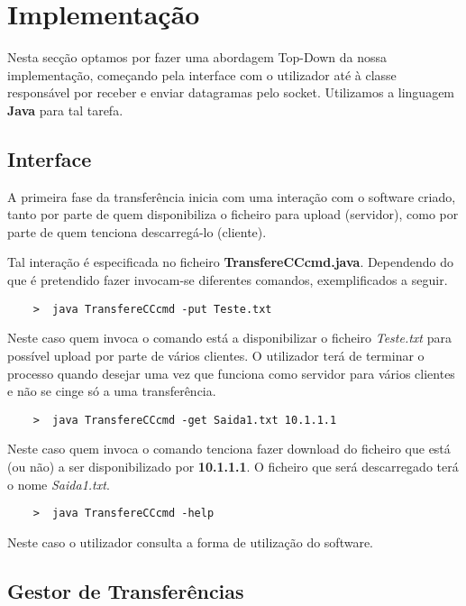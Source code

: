 \documentclass{llncs}
\begin{document}
\section{Implementação}

Nesta secção optamos por fazer uma abordagem Top-Down da nossa implementação, começando pela interface com o utilizador até à classe responsável por receber e enviar datagramas pelo socket. Utilizamos a linguagem \textbf{Java} para tal tarefa.


\subsection{Interface}

A primeira fase da transferência inicia com uma interação com o software criado, tanto por parte de quem disponibiliza o ficheiro para upload (servidor), como por parte de quem tenciona descarregá-lo (cliente). 

Tal interação é especificada no ficheiro \textbf{TransfereCCcmd.java}. Dependendo do que é pretendido fazer invocam-se diferentes comandos, exemplificados a seguir.

\begin{verbatim}
	>  java TransfereCCcmd -put Teste.txt
\end{verbatim}

Neste caso quem invoca o comando está a disponibilizar o ficheiro \textit{Teste.txt} para possível upload por parte de vários clientes. O utilizador terá de terminar o processo quando desejar uma vez que funciona como servidor para vários clientes e não se cinge só a uma transferência.

\begin{verbatim}
	>  java TransfereCCcmd -get Saida1.txt 10.1.1.1
\end{verbatim}

Neste caso quem invoca o comando tenciona fazer download do ficheiro que está (ou não) a ser disponibilizado por \textbf{10.1.1.1}. O ficheiro que será descarregado terá o nome \textit{Saida1.txt}.

\begin{verbatim}
	>  java TransfereCCcmd -help
\end{verbatim}

Neste caso o utilizador consulta a forma de utilização do software.


\subsection{Gestor de Transferências}
\end{document}
